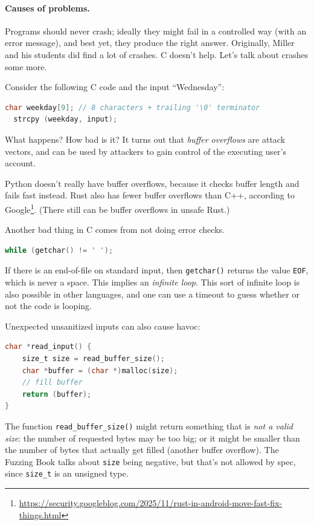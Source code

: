 \documentclass[11pt]{article}
\begin{document}
\paragraph{Causes of problems.} Programs should never crash; ideally they
might fail in a controlled way (with an error message), and best yet,
they produce the right answer. Originally, Miller and his students
did find a lot of crashes. C doesn't help. Let's talk about crashes some more.

Consider the following C code and the input ``Wednesday'':
\begin{lstlisting}[language=C]
  char weekday[9]; // 8 characters + trailing '\0' terminator
  strcpy (weekday, input);
\end{lstlisting}
What happens? How bad is it? It turns out that \emph{buffer overflows}
are attack vectors, and can be used by attackers to gain control
of the executing user's account.

Python doesn't really have buffer overflows, because it checks buffer
length and fails fast instead. Rust also has fewer buffer overflows
than C++, according to Google\footnote{\url{https://security.googleblog.com/2025/11/rust-in-android-move-fast-fix-things.html}}. (There still can be
buffer overflows in unsafe Rust.)

Another bad thing in C comes from not doing error checks.
\begin{lstlisting}[language=C]
  while (getchar() != ' ');
\end{lstlisting}
If there is an end-of-file on standard input, then \texttt{getchar()}
returns the value \texttt{EOF}, which is never a space. This
implies an \emph{infinite loop}. This sort of infinite loop is also
possible in other languages, and one can use a timeout to guess
whether or not the code is looping.

Unexpected unsanitized inputs can also cause havoc:
\begin{lstlisting}[language=C]
char *read_input() {
    size_t size = read_buffer_size();
    char *buffer = (char *)malloc(size);
    // fill buffer
    return (buffer);
}
\end{lstlisting}
The function \texttt{read\_buffer\_size()} might return
something that is \emph{not a valid size}: the number of requested
bytes may be too big; or it might be smaller than the number
of bytes that actually get filled (another buffer overflow).
The Fuzzing Book talks about \texttt{size} being negative,
but that's not allowed by spec, since \texttt{size\_t} is an unsigned type.
\end{document}
